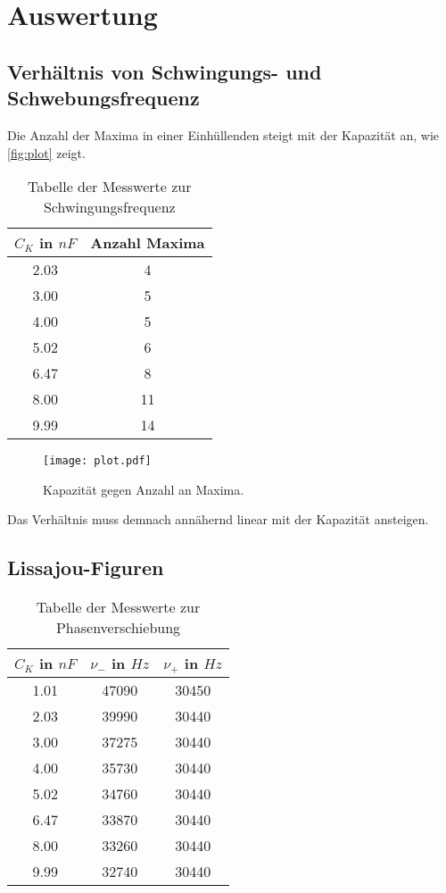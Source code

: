 \newpage
\section{Auswertung}
\label{sec:Auswertung}

\subsection{Verhältnis von Schwingungs- und Schwebungsfrequenz}
Die Anzahl der Maxima in einer Einhüllenden steigt mit der Kapazität an, wie \autoref{fig:plot} zeigt.
\begin{table}
  \centering
  \caption{Tabelle der Messwerte zur Schwingungsfrequenz}
  \label{tab:tab1}
  \begin{tabular}{c c}
    \toprule
    \(C_K\) in $nF$ & Anzahl Maxima\\
    \midrule
    2.03 & 4\\
    3.00 & 5\\
    4.00 & 5\\
    5.02 & 6\\
    6.47 & 8\\
    8.00 & 11\\
    9.99 & 14\\
    \bottomrule
  \end{tabular}
\end{table}

\begin{figure}
  \centering
  \texttt{[image: plot.pdf]}
  \caption{Kapazität gegen Anzahl an Maxima.}
  \label{fig:plot}
\end{figure}
Das Verhältnis muss demnach annähernd linear mit der Kapazität ansteigen.
\newpage
\subsection{Lissajou-Figuren}

\begin{table}
  \centering
  \caption{Tabelle der Messwerte zur Phasenverschiebung}
  \label{tab:tab2}
  \begin{tabular}{c c c}
    \toprule
    \(C_K\) in $nF$ & \(\nu_-\) in $Hz$ & \(\nu_+\) in $Hz$\\
    \midrule
    1.01 & 47090 & 30450\\
    2.03 & 39990 & 30440\\
    3.00 & 37275 & 30440\\
    4.00 & 35730 & 30440\\
    5.02 & 34760 & 30440\\
    6.47 & 33870 & 30440\\
    8.00 & 33260 & 30440\\
    9.99 & 32740 & 30440\\
    \bottomrule
  \end{tabular}
\end{table}

